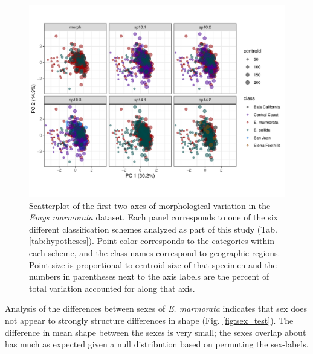 \documentclass[12pt,letterpaper]{article}
\begin{document}
\begin{figure}[ht]
  \centering
  \includegraphics[height = \textheight, width = \textwidth, keepaspectratio = true]{figure/emys_pc_graph}
  \caption{Scatterplot of the first two axes of morphological variation in the \textit{Emys marmorata} dataset. Each panel corresponds to one of the six different classification schemes analyzed as part of this study (Tab. \ref{tab:hypotheses}). Point color corresponds to the categories within each scheme, and the class names correspond to geographic regions. Point size is proportional to centroid size of that specimen and the numbers in parentheses next to the axis labels are the percent of total variation accounted for along that axis.}
  \label{fig:emys_pca}
\end{figure}


Analysis of the differences between sexes of \textit{E. marmorata} indicates that sex does not appear to strongly structure differences in shape (Fig. \ref{fig:sex_test}). The difference in mean shape between the sexes is very small; the sexes overlap about has much as expected given a null distribution based on permuting the sex-labels.
\end{document}

